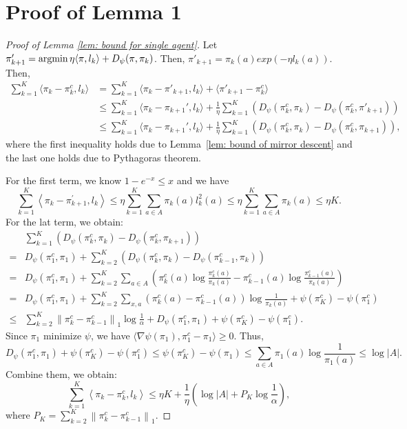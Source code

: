 \documentclass[11pt]{article}
\begin{document}
\section{Proof of Lemma 1}
\begin{proof}[Proof of Lemma \ref{lem: bound for single agent}]
    Let $\pi'_{k+1} = \mathop{\mathrm{argmin}} \eta \langle \pi, l_k \rangle + D_\psi(\pi, \pi_k)$. Then, $\pi'_{k+1} = \pi_k(a)exp(-\eta l_k(a))$.  Then, 
    \begin{align*}
        \sum_{k=1}^K \langle \pi_k - \pi_k^c, l_k \rangle & = \sum_{k=1}^K \langle \pi_k -\pi'_{k+1}, l_k \rangle  + \langle \pi'_{k+1} - \pi_k^c \rangle \\ 
        & \le \sum_{k=1}^K \langle \pi_k - \pi_{k+1}', l_k \rangle + \frac{1}{\eta}\sum_{k=1}^K \left( D_\psi (\pi_k^c, \pi_k) - D_\psi(\pi_k^c , \pi'_{k+1}) \right)\\ 
        &\le \sum_{k=1}^K \langle \pi_k - \pi_{k+1}', l_k \rangle + \frac{1}{\eta}\sum_{k=1}^K \left( D_\psi (\pi_k^c, \pi_k) - D_\psi(\pi_k^c , \pi_{k+1}) \right),
    \end{align*} 
    where the first inequality holds due to Lemma~\ref{lem: bound of mirror descent} and the last one holds due to Pythagoras theorem. 
    
    For the first term, we know $1-e^{-x} \le x$ and we have 
    \[
        \sum_{k=1}^K\left\langle \pi_k-\pi_{k+1}^{\prime}, l_k\right\rangle \leq \eta \sum_{k=1}^K \sum_{ a\in A} \pi_k( a) l_k^2( a) \leq \eta \sum_{k=1}^K \sum_{ a\in A} \pi_k( a) \leq \eta K .
    \]
    For the lat term, we obtain: 
    \[
        \begin{aligned}
            & \sum_{k=1}^K\left(D_\psi\left(\pi_k^c, \pi_k\right)-D_\psi\left(\pi_k^c, \pi_{k+1}\right)\right) \\
            =& D_\psi\left(\pi_1^c, \pi_1\right)+\sum_{k=2}^K\left(D_\psi\left(\pi_k^c, \pi_k\right)-D_\psi\left(\pi_{k-1}^c, \pi_k\right)\right) \\
            =& D_\psi\left(\pi_1^c, \pi_1\right)+\sum_{k=2}^K \sum_{ a\in A}\left(\pi_k^c(a) \log \frac{\pi_k^c(a)}{\pi_k(a)}-\pi_{k-1}^c(a) \log \frac{\pi_{k-1}^c(a)}{\pi_k(a)}\right) \\
            =& D_\psi\left(\pi_1^c, \pi_1\right)+\sum_{k=2}^K \sum_{x, a}\left(\pi_k^c(a)-\pi_{k-1}^c(a)\right) \log \frac{1}{\pi_k(a)}+\psi\left(\pi_K^c\right)-\psi\left(\pi_{1}^c\right) \\
            \leq & \sum_{k=2}^K\left\|\pi_k^c-\pi_{k-1}^c\right\|_1 \log \frac{1}{\alpha}+D_\psi\left(\pi_1^c, \pi_1\right)+\psi\left(\pi_K^c\right)-\psi\left(\pi_{1}^c\right).
            \end{aligned}
    \]
    Since $\pi_1$ minimize $\psi$, we have $\langle \nabla \psi(\pi_1), \pi_1^c- \pi_1 \rangle \ge 0$. Thus, 
    \[
        D_\psi (\pi_1^c, \pi_1) + \psi(\pi_K^c) - \psi(\pi_1^c) \le \psi(\pi_K^c) - \psi(\pi_1)\le \sum_{a\in A}\pi_1(a)\log \frac{1}{\pi_1(a)} \le \log |A|. 
    \] 
    Combine them, we obtain: 
    \[
        \sum_{k=1}^K\left\langle\pi_k-\pi_k^c, l_k\right\rangle \leq \eta K+\frac{1}{\eta}\left(\log |A|+P_K \log \frac{1}{\alpha}\right), 
    \]
    where $P_K=\sum_{k=2}^K\left\|\pi_k^c-\pi_{k-1}^c\right\|_1$. 
    \end{proof}
\end{document}
